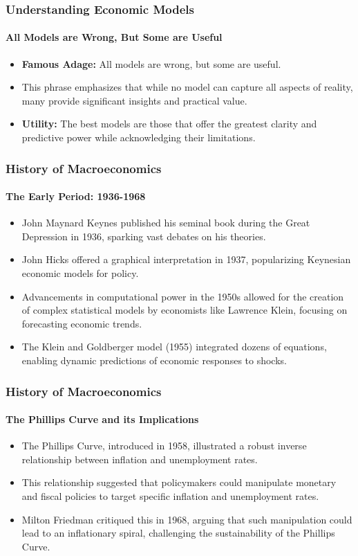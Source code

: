 \documentclass{beamer}
\begin{document}
            \begin{frame}
                \frametitle{Understanding Economic Models}
                \framesubtitle{All Models are Wrong, But Some are Useful}
                    \begin{itemize}
                        \item \textbf{Famous Adage:} All models are wrong, but some are useful.
                        \item This phrase emphasizes that while no model can capture all aspects of reality, many provide significant insights and practical value.
                        \item \textbf{Utility:} The best models are those that offer the greatest clarity and predictive power while acknowledging their limitations.
                    \end{itemize}
                \end{frame}

\begin{frame}
    \frametitle{History of Macroeconomics}
    \framesubtitle{The Early Period: 1936-1968}
        \begin{itemize}
            \item John Maynard Keynes published his seminal book during the Great Depression in 1936, sparking vast debates on his theories.
            \item John Hicks offered a graphical interpretation in 1937, popularizing Keynesian economic models for policy.
            \item Advancements in computational power in the 1950s allowed for the creation of complex statistical models by economists like Lawrence Klein, focusing on forecasting economic trends.
            \item The Klein and Goldberger model (1955) integrated dozens of equations, enabling dynamic predictions of economic responses to shocks.
        \end{itemize}
    \end{frame}
    
    \begin{frame}
        \frametitle{History of Macroeconomics}
        \framesubtitle{The Phillips Curve and its Implications}
            \begin{itemize}
                \item The Phillips Curve, introduced in 1958, illustrated a robust inverse relationship between inflation and unemployment rates.
                \item This relationship suggested that policymakers could manipulate monetary and fiscal policies to target specific inflation and unemployment rates.
                \item Milton Friedman critiqued this in 1968, arguing that such manipulation could lead to an inflationary spiral, challenging the sustainability of the Phillips Curve.
            \end{itemize}
        \end{frame}
                        
\end{document}
